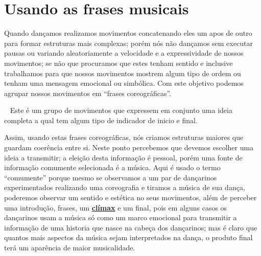 
\section{Usando as frases musicais}
Quando dançamos realizamos movimentos concatenando eles um apos de outro 
para formar estruturas mais complexas;
porém nós não dançamos sem executar pausas ou 
variando aleatoriamente a velocidade e a expressividade de nossos movimentos; 
se não que procuramos que estes tenham sentido 
e inclusive trabalhamos para que nossos movimentos mostrem algum tipo de ordem ou tenham uma mensagem emocional ou simbólica.
Com este objetivo podemos agrupar nossos movimentos em ``frases coreográficas''.
\begin{definition}~
Este é um grupo de movimentos que expressem em conjunto uma ideia completa 
a qual tem algum tipo de indicador de inicio e final. 
\end{definition}

Assim, usando estas frases coreográficas, 
nós criamos estruturas maiores que guardam coerência entre si. 
Neste ponto percebemos que devemos escolher uma ideia a transmitir;
a eleição desta informação é pessoal, 
porém uma fonte de informação comumente selecionada é a música.
Aqui é usado o termo ``comumente'' porque mesmo se 
observamos a um par de dançarinos experimentados realizando uma coreografia e 
tiramos a música de sua dança, 
poderemos observar um sentido e estética no seus movimentos,
além de perceber uma introdução, frases, um \hyperref[ref:climax]{\textbf{clímax}}  e um final,
pois em alguns casos os dançarinos usam a música só como um marco emocional 
para transmitir a informação de uma historia que nasce na cabeça dos dançarinos;
mas é claro que quantos mais aspectos da música sejam interpretados na dança,
o produto final terá um aparência de maior musicalidade.

